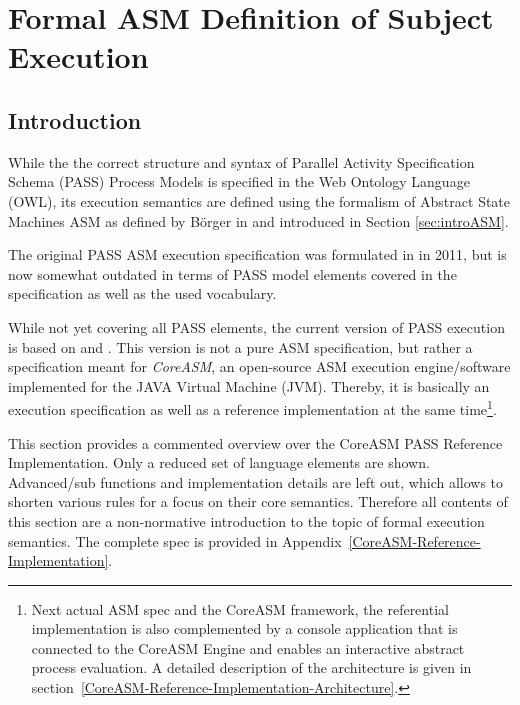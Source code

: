 \section{Formal ASM Definition of Subject Execution}
\label{sec:PASSExec}


\subsection{Introduction}

While the the correct structure and syntax of Parallel Activity Specification Schema (PASS) Process Models is specified in the Web Ontology Language (OWL), its execution semantics are defined using the formalism of Abstract State Machines ASM as defined by Börger in \cite{book:ASM-2003} and introduced in Section \ref{sec:introASM}.

The original PASS ASM execution specification was formulated in \cite{boerger2011interpreter} in 2011, but is now somewhat outdated in terms of PASS model elements covered in the specification as well as the used vocabulary. 

While not yet covering all PASS elements, the current version of PASS execution is based on \cite{article:PASS-ASM} and \cite{article:PASS-CoreASM}. This version is not a pure ASM specification, but rather a specification meant for \textit{CoreASM}, an open-source ASM execution engine/software implemented for the JAVA Virtual Machine (JVM)\cite{Farahbod2011}. Thereby, it is basically an execution specification as well as a reference implementation at the same time\footnote{Next actual ASM spec and the CoreASM framework, the referential implementation is also complemented by a console application that is connected to the CoreASM Engine and enables an interactive abstract process evaluation. A detailed description of the architecture is given in section~\ref{CoreASM-Reference-Implementation-Architecture}.}.

This section provides a commented overview over the CoreASM PASS Reference Implementation. Only a reduced set of language elements are shown. Advanced/sub functions and implementation details are left out, which allows to shorten various rules for a focus on their core semantics. Therefore all contents of this section are a non-normative introduction to the topic of formal execution semantics. The complete spec is provided in Appendix~\ref{CoreASM-Reference-Implementation}. 


